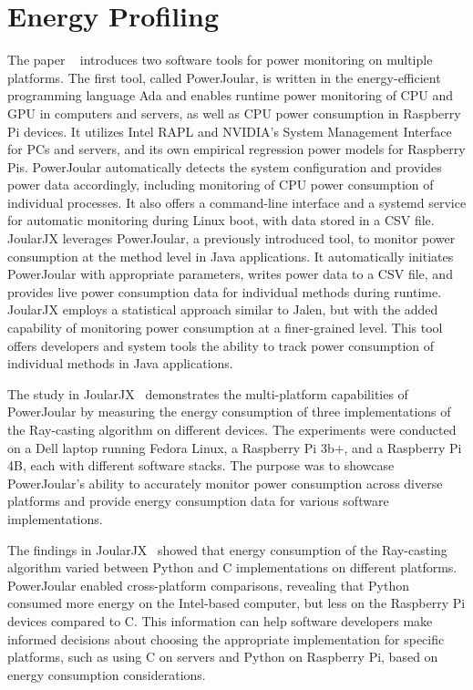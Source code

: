 \section{Energy Profiling}

\setlength{\parskip}{5pt}

The paper ~\cite{DBLP:conf/intenv/Noureddine22} introduces two software tools for power monitoring on multiple platforms. The first tool, called PowerJoular, is written in the energy-efficient programming language Ada and enables runtime power monitoring of CPU and GPU in computers and servers, as well as CPU power consumption in Raspberry Pi devices. It utilizes Intel RAPL and NVIDIA's System Management Interface for PCs and servers, and its own empirical regression power models for Raspberry Pis. PowerJoular automatically detects the system configuration and provides power data accordingly, including monitoring of CPU power consumption of individual processes. It also offers a command-line interface and a systemd service for automatic monitoring during Linux boot, with data stored in a CSV file. JoularJX leverages PowerJoular, a previously introduced tool, to monitor power consumption at the method level in Java applications. It automatically initiates PowerJoular with appropriate parameters, writes power data to a CSV file, and provides live power consumption data for individual methods during runtime. JoularJX employs a statistical approach similar to Jalen, but with the added capability of monitoring power consumption at a finer-grained level. This tool offers developers and system tools the ability to track power consumption of individual methods in Java applications.\par


The study in JoularJX~\cite{DBLP:conf/intenv/Noureddine22} demonstrates the multi-platform capabilities of PowerJoular by measuring the energy consumption of three implementations of the Ray-casting algorithm on different devices. The experiments were conducted on a Dell laptop running Fedora Linux, a Raspberry Pi 3b+, and a Raspberry Pi 4B, each with different software stacks. The purpose was to showcase PowerJoular's ability to accurately monitor power consumption across diverse platforms and provide energy consumption data for various software implementations.\par

The findings in JoularJX~\cite{DBLP:conf/intenv/Noureddine22} showed that energy consumption of the Ray-casting algorithm varied between Python and C implementations on different platforms. PowerJoular enabled cross-platform comparisons, revealing that Python consumed more energy on the Intel-based computer, but less on the Raspberry Pi devices compared to C. This information can help software developers make informed decisions about choosing the appropriate implementation for specific platforms, such as using C on servers and Python on Raspberry Pi, based on energy consumption considerations.\par

